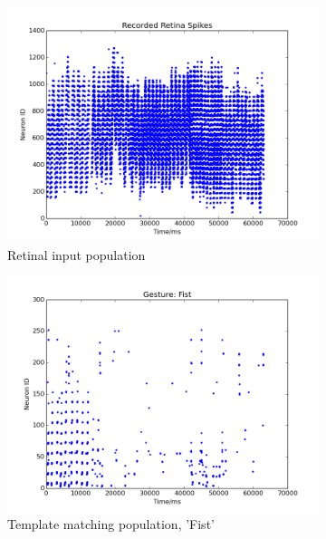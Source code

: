 \documentclass[journal]{journal}
\begin{document}
\begin{figure}
\centering
	\begin{subfigure}[t]{0.24\textwidth}
		\includegraphics[width=\textwidth]{pics/figure_r.png}
	    \caption{Retinal input population }
	    \label{fig:ssa}
	\end{subfigure}
	\begin{subfigure}[t]{0.24\textwidth}
		\includegraphics[width=\textwidth]{pics/figure_1.png}
		\caption{Template matching population, 'Fist'}
	    \label{fig:rec0}
	\end{subfigure}
	\\
	\begin{subfigure}[t]{0.24\textwidth}

\end{subfigure}
\end{figure}
\end{document}
